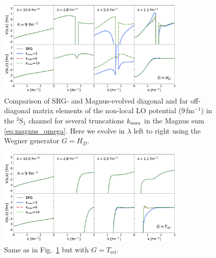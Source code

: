 \documentclass[10pt,aps,prc,floatfix,twocolumn,nofootinbib]{revtex4-1}
\newcommand{\Trel}{\ensuremath{T_{\textrm{rel}}}}
\begin{document}
%
\begin{figure}[tbh]
	\includegraphics[clip,width=0.8\textwidth]{potential_slices_kvnn_901_Wegner_k_magnus_values_2_6_10.pdf}%
	\caption{Comparison of SRG- and Magnus-evolved diagonal and far off-diagonal matrix elements of the non-local LO potential (9\,fm$^{-1}$) in the $^3$S$_1$ channel for several truncations $k_{\rm max}$ in the Magnus sum \eqref{eq:magnus_omega}. Here we evolve in $\lambda$ left to right using the Wegner generator $G=H_D$.}
	\label{fig:potential_slices_high_cutoffs_Wegner}
\end{figure}
%
\begin{figure}[tbh]
	\includegraphics[clip,width=0.8\textwidth]{potential_slices_kvnn_901_T_k_magnus_values_2_6_10.pdf}%
	\caption{Same as in Fig.~\ref{fig:potential_slices_high_cutoffs_Wegner} but with $G=\Trel$.}
	\label{fig:potential_slices_high_cutoffs_T}
\end{figure}
%
\end{document}
